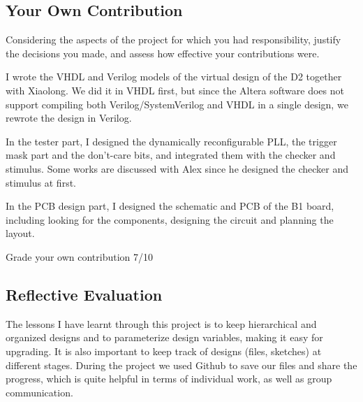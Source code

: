 \subsection{Your Own Contribution}

Considering the aspects of the project for which you had responsibility, justify the decisions you made, and assess how effective your contributions were.

I wrote the VHDL and Verilog models of the virtual design of the D2 together with Xiaolong. We did it in VHDL first, but since the Altera software does not support compiling both Verilog/SystemVerilog and VHDL in a single design, we rewrote the design in Verilog.

In the tester part, I designed the dynamically reconfigurable PLL, the trigger mask part and the don’t-care bits, and integrated them with the checker and stimulus. Some works are discussed with Alex since he designed the checker and stimulus at first.

In the PCB design part, I designed the schematic and PCB of the B1 board, including looking for the components, designing the circuit and planning the layout.

Grade your own contribution		7/10


\subsection{Reflective Evaluation}

The lessons I have learnt through this project is to keep hierarchical and organized designs and to parameterize design variables, making it easy for upgrading. It is also important to keep track of designs (files, sketches) at different stages. During the project we used Github to save our files and share the progress, which is quite helpful in terms of individual work, as well as group communication.

